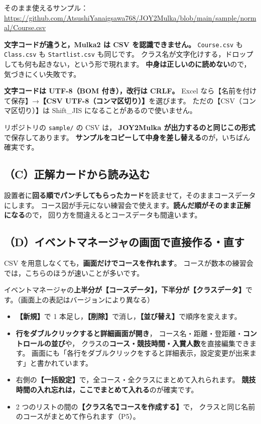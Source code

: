 \documentclass[a4paper,10pt]{ltjsarticle}
\newcommand{\ver}{\textsf{\small（画面上の表記はバージョンにより異なる）}}
\begin{document}
そのまま使えるサンプル：\\
\url{https://github.com/AtsushiYanaigsawa768/JOY2Mulka/blob/main/sample/normal/Course.csv}

\begin{Note}
\textbf{文字コードが違うと，Mulka2 は CSV を認識できません。}
\texttt{Course.csv} も \texttt{Class.csv} も \texttt{Startlist.csv} も同じです。
クラス名が文字化けする，ドロップしても何も起きない，という形で現れます。
\textbf{中身は正しいのに読めない}ので，気づきにくい失敗です。

\textbf{文字コードは UTF-8（BOM 付き），改行は CRLF。}
Excel なら【名前を付けて保存】→\textbf{【CSV UTF-8（コンマ区切り）】}を選びます。
ただの【CSV（コンマ区切り）】は Shift\_JIS になることがあるので使いません。

リポジトリの \texttt{sample/} の CSV は，
\textbf{JOY2Mulka が出力するのと同じこの形式}で保存してあります。
\textbf{サンプルをコピーして中身を差し替える}のが，いちばん確実です。
\end{Note}

\subsection*{（C）正解カードから読み込む}

設置者に\textbf{回る順でパンチしてもらったカード}を読ませて，そのままコースデータにします。
コース図が手元にない練習会で使えます。\textbf{読んだ順がそのまま正解になる}ので，
回り方を間違えるとコースデータも間違います。

\subsection*{（D）イベントマネージャの画面で直接作る・直す}

CSV を用意しなくても，\textbf{画面だけでコースを作れます}。
コースが数本の練習会では，こちらのほうが速いことが多いです。

イベントマネージャの\textbf{上半分が【コースデータ】，下半分が【クラスデータ】}です。\ver

\begin{itemize}
\item \textbf{【新規】}で 1 本足し，\textbf{【削除】}で消し，\textbf{【並び替え】}で順序を変えます。
\item \textbf{行をダブルクリックすると詳細画面が開き}，
      コース名・距離・登距離・\textbf{コントロールの並び}や，
      クラスの\textbf{コース・競技時間・入賞人数}を直接編集できます。
      画面にも「各行をダブルクリックをすると詳細表示，設定変更が出来ます」と書かれています。
\item 右側の\textbf{【一括設定】}で，全コース・全クラスにまとめて入れられます。
      \textbf{競技時間の入れ忘れは，ここでまとめて入れる}のが確実です。
\item 2 つのリストの間の\textbf{【クラス名でコースを作成する】}で，
      クラスと同じ名前のコースがまとめて作られます（P5）。
\end{itemize}
\end{document}
